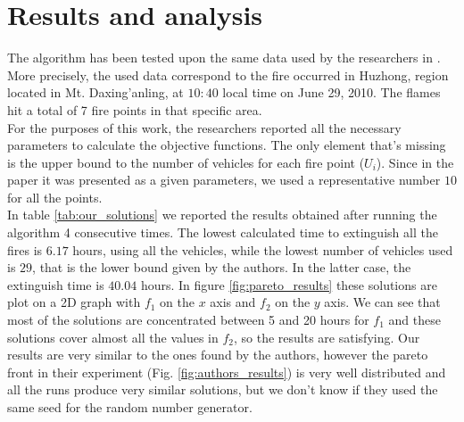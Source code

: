 \section{Results and analysis}
The algorithm has been tested upon the same data used by the researchers in \cite{fire_distinguish}. More precisely, the used data correspond to the fire occurred in Huzhong, region located in
Mt. Daxing’anling, at $10:40$ local time on June 29, 2010. The flames hit a total of 7 fire points in that specific area. \\
For the purposes of this work, the researchers reported all the necessary parameters to calculate the objective functions. The only element that's missing is the upper bound to the number
of vehicles for each fire point ($U_i$). Since in the paper it was presented as a given parameters, we used a representative number $10$ for all the points.\\
In table \ref{tab:our_solutions} we reported the results obtained after running the algorithm 4 consecutive times. The lowest calculated time to extinguish all
the fires is $6.17$ hours, using all the vehicles, while the lowest number of vehicles used is $29$, that is the lower bound given by the authors. In the latter case, the extinguish
time is $40.04$ hours. In figure \ref{fig:pareto_results} these solutions are plot on a 2D graph with $f_1$ on the $x$ axis and $f_2$ on the $y$ axis. 
We can see that most of the solutions are concentrated between 5 and 20 hours for $f_1$ and these solutions cover almost all the values in $f_2$, so the results are satisfying. 
Our results are very similar to the ones found by the authors, however the pareto front in their experiment (Fig. \ref{fig:authors_results}) is very well distributed and 
all the runs produce very similar solutions, but we don't know if they used the same seed for the random number generator.
